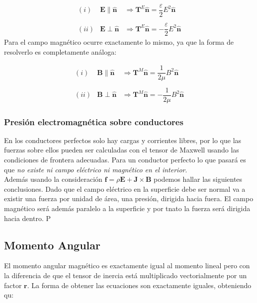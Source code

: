 \documentclass[12pt,a4paper]{article}
\newcommand{\Bn}{\mathbf{B}}
\newcommand{\En}{\mathbf{E}}
\newcommand{\Jn}{\mathbf{J}}
\newcommand{\fn}{\mathbf{f}}
\newcommand{\rn}{\mathbf{r}}
\newcommand{\Tn}{\mathbf{T}}
\newcommand{\hnn}{\hat{\mathbf{n}}}
\numberwithin{equation}{section}
\numberwithin{figure}{section}
\begin{document}
\begin{equation}
\begin{array}{rcl} 
(i) & \En \parallel \hnn & \Longrightarrow \Tn^E  \hnn = \dfrac{\varepsilon}{2} E^2 \hnn \\ \\

(ii) & \En \perp \hnn & \Longrightarrow \Tn^E \hnn = - \dfrac{\varepsilon}{2} E^2 \hnn
\end{array}
\end{equation}
Para el campo magnético ocurre exactamente lo mismo, ya que la forma de resolverlo es completamente análoga:

\begin{equation}
\begin{array}{rcl} 
(i) & \Bn \parallel \hnn & \Longrightarrow \Tn^M \hnn = \dfrac{1}{2 \mu}  B^2 \hnn \\ \\

(ii) & \Bn \perp \hnn & \Longrightarrow \Tn^M \hnn = - \dfrac{1}{2 \mu} B^2 \hnn
\end{array}
\end{equation}


\subsubsection{Presión electromagnética sobre conductores}

En los conductores perfectos solo hay cargas y corrientes libres, por lo que las fuerzas sobre ellos pueden ser calculadas con el tensor de Maxwell usando las condiciones de frontera adecuadas. Para un conductor perfecto lo que pasará es que \textit{no existe ni campo eléctrico ni magnético en el interior}. \\

Además usando la consideración $\fn = \rho \En + \Jn \times \Bn$ podemos hallar las siguientes conclusiones. Dado que el campo eléctrico en la superficie debe ser normal va a existir una fuerza por unidad de área, una presión, dirigida hacia fuera. El campo magnético será además paralelo a la superficie y  por tnato la fuerza será dirigida hacia dentro. P

\subsection{Momento Angular}

El momento angular magnético es exactamente igual al momento lineal pero con la diferencia de que el tensor de inercia está multiplicado vectorialmente por un factor $\rn$. La forma de obtener las ecuaciones son exactamente iguales, obteniendo qu:
\end{document}
